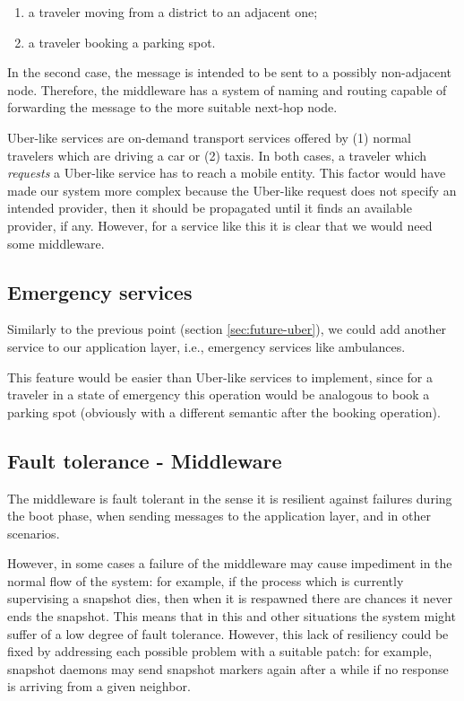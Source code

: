 \begin{enumerate}
  \item a traveler moving from a district to an adjacent one;
  \item a traveler booking a parking spot.
\end{enumerate}

In the second case, the message is intended to be sent to a possibly
non-adjacent node. Therefore, the middleware has a system of naming and routing
capable of forwarding the message to the more suitable next-hop node.

Uber-like services are on-demand transport services offered by (1) normal
travelers which are driving a car or (2) taxis. In both cases, a traveler
which \textit{requests} a Uber-like service has to reach a mobile entity.
This factor would have made our system more complex because the Uber-like
request does not specify an intended provider, then it should be propagated
until it finds an available provider, if any.
However, for a service like this it is clear that we would need some middleware.

\subsection{Emergency services}
Similarly to the previous point (section \ref{sec:future-uber}), we could add
another service to our application layer, i.e., emergency services like
ambulances.

This feature would be easier than Uber-like services to implement, since for a
traveler in a state of emergency this operation would be analogous to book a
parking spot (obviously with a different semantic after the booking operation).

\subsection{Fault tolerance - Middleware}
The middleware is fault tolerant in the sense it is resilient against failures
during the boot phase, when sending messages to the application layer, and in
other scenarios.

However, in some cases a failure of the middleware may cause impediment in the
normal flow of the system: for example, if the process which is currently
supervising a snapshot dies, then when it is respawned there are chances it
never ends the snapshot.
This means that in this and other situations the system might suffer of a low
degree of fault tolerance. However, this lack of resiliency could be fixed by
addressing each possible problem with a suitable patch: for example, snapshot
daemons may send snapshot markers again after a while if no response is
arriving from a given neighbor.

